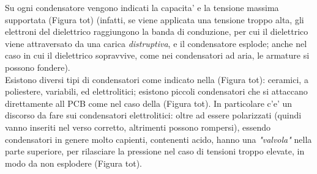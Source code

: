 \documentclass[12pt]{article}
\begin{document}
Su ogni condensatore vengono indicati la capacita' e la tensione 
massima supportata (Figura tot) (infatti, se viene applicata una tensione troppo alta, gli elettroni del dielettrico raggiungono la banda di conduzione, per cui il dielettrico viene attraversato da una carica \textit{distruptiva}, e il condensatore esplode; anche nel caso in cui il dielettrico
sopravvive, come nei condensatori ad aria, le armature si possono fondere). \\

Esistono diversi tipi di condensatori come indicato nella (Figura tot): ceramici, a poliestere, variabili, ed elettrolitici; esistono piccoli condensatori che si attaccano direttamente all PCB
come nel caso della (Figura tot). In particolare c'e' un discorso da fare sui condensatori elettrolitici: oltre ad essere polarizzati (quindi vanno inseriti nel verso corretto, altrimenti possono rompersi), essendo condensatori in genere molto capienti, contenenti acido, hanno una \textit{"valvola"} nella parte superiore, per rilasciare la pressione nel caso di tensioni troppo elevate, in modo da non esplodere (Figura tot). \\ 
\end{document}

